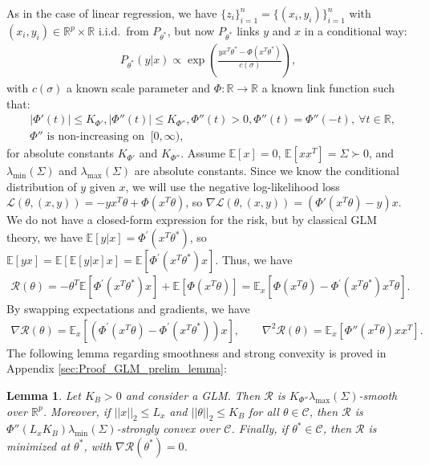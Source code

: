 \documentclass{article}
\newtheorem{lemma}{Lemma}
\newcommand{\iid}{i.i.d.{\ }}
\begin{document}
As in the case of linear regression, we have $\{z_i\}_{i = 1}^n = \{(x_i, y_i)\}_{i = 1}^n$ with $(x_i, y_i) \in \mathbb{R}^p \times \mathbb{R}$ \iid from $P_{\theta^*}$, but now $P_{\theta^*}$ links $y$ and $x$ in a conditional way:
\begin{align*}
P_{\theta^*}(y|x) \propto \exp\left(\frac{yx^T\theta^* - \Phi(x^T\theta^*)}{c(\sigma)} \right),
\end{align*}
with $c(\sigma)$ a known scale parameter and $\Phi : \mathbb{R} \rightarrow \mathbb{R}$ a known link function such that:
\begin{align*}
&|\Phi'(t)| \leq K_{\Phi'}, |\Phi''(t)| \leq K_{\Phi''}, \Phi''(t) > 0, \Phi''(t) = \Phi''(-t), \ \forall t \in \mathbb{R},\\
& \Phi'' \text{ is non-increasing on } \ [0, \infty),
\end{align*}
for absolute constants $K_{\Phi'}$ and $K_{\Phi''}$. Assume $\mathbb{E}[x] = 0$, $\mathbb{E}[xx^T] = \Sigma \succ 0$, and $\lambda_{\min}(\Sigma)$ and $\lambda_{\max}(\Sigma)$ are absolute constants. Since we know the conditional distribution of $y$ given $x$, we will use the negative log-likelihood loss
$\mathcal{L}(\theta, (x, y)) = -yx^T\theta + \Phi(x^T\theta)$, so $\nabla \mathcal{L}(\theta, (x, y)) = \left(\Phi'(x^T\theta) - y\right)x$. We do not have a closed-form expression for the risk, but by classical GLM theory, we have $\mathbb{E}[y|x] = \Phi^{'}(x^T\theta^*)$, so $\mathbb{E}[yx] = \mathbb{E}\left[\mathbb{E}[y|x]x\right] = \mathbb{E}[\Phi^{'}(x^T\theta^*)x]$. Thus, we have
\begin{align*}
\mathcal{R}(\theta) = -\theta^T\mathbb{E}[\Phi^{'}(x^T\theta^*)x] + \mathbb{E}[\Phi(x^T\theta)] = \mathbb{E}_{x}[\Phi(x^T\theta) - \Phi^{'}(x^T\theta^*)x^T\theta].
\end{align*}
By swapping expectations and gradients, we have
\begin{align}
\label{eq:GLMder}
\nabla \mathcal{R}(\theta) = \mathbb{E}_{x}[(\Phi^{'}(x^T\theta) - \Phi^{'}(x^T\theta^*))x], \qquad
\nabla^2 \mathcal{R}(\theta) = \mathbb{E}_{x}[\Phi''(x^T\theta)xx^T].
\end{align}
The following lemma regarding smoothness and strong convexity is proved in Appendix \ref{sec:Proof_GLM_prelim_lemma}:
\begin{lemma}
\label{lemma:GLM_prelim_lem}
Let $K_B > 0$ and consider a GLM. Then $\mathcal{R}$ is $K_{\Phi''}\lambda_{\max}(\Sigma)$-smooth over $\mathbb{R}^p$. Moreover, if $||x||_2 \leq L_x$ and $||\theta||_2 \leq K_B$ for all $\theta \in \mathcal{C}$, then $\mathcal{R}$ is $\Phi''(L_xK_B)\lambda_{\min}(\Sigma)$-strongly convex over $\mathcal{C}$. Finally, if $\theta^* \in \mathcal{C}$, then $\mathcal{R}$ is minimized at $\theta^*$, with $\nabla\mathcal{R}(\theta^*) = 0$.
\end{lemma}
\end{document}
